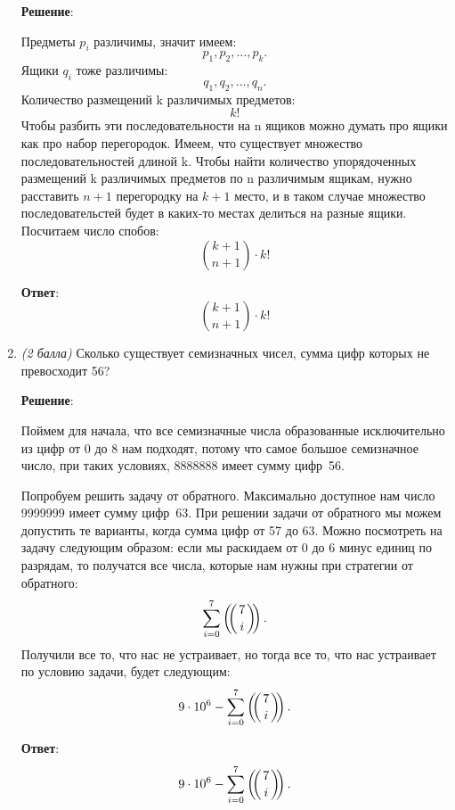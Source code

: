 \documentclass{article}
\def\multiset#1#2{\ensuremath{\left(\kern-.3em\left(\genfrac{}{}{0pt}{}{#1}{#2}\right)\kern-.3em\right)}}
\begin{document}
\begin{enumerate}
    \textbf{Решение}:

    Предметы $p_i$ различимы, значит имеем:
    \begin{equation}
      p_1, p_2, \ldots, p_k.
    \end{equation}
    Ящики $q_i$ тоже различимы:
    \begin{equation}
      q_1, q_2, \ldots, q_n.
    \end{equation}
    Количество размещений k различимых предметов:
    \begin{equation}
      k!
    \end{equation}
    Чтобы разбить эти последовательности на n ящиков можно думать про ящики как про набор перегородок. Имеем, что существует множество последовательностей длиной k. Чтобы найти количество упорядоченных размещений k различимых предметов по n различимым ящикам, нужно расставить $n + 1$ перегородку на $k + 1$ место, и в таком случае множество последовательстей будет в каких-то местах делиться на разные ящики. Посчитаем число спобов:
    \begin{equation}
      \binom{k + 1}{n + 1} \cdot k!
    \end{equation}

    \textbf{Ответ}:
    $$\binom{k + 1}{n + 1} \cdot k!$$

  \item \textit{(2 балла)} Сколько существует семизначных чисел, сумма цифр которых не превосходит 56?
  
    \textbf{Решение}:

    Поймем для начала, что все семизначные числа образованные исключительно из цифр от 0 до 8 нам подходят, потому что самое большое семизначное число, при таких условиях, 8888888 имеет сумму цифр~56.
    
    Попробуем решить задачу от обратного. Максимально доступное нам число 9999999 имеет сумму цифр~63. При решении задачи от обратного мы можем допустить те варианты, когда сумма цифр от 57 до 63. Можно посмотреть на задачу следующим образом: если мы раскидаем от 0 до 6 минус единиц по разрядам, то получатся все числа, которые нам нужны при стратегии от обратного:
    \begin{equation}
      \sum_{i = 0}^{7} \multiset{7}{i}.
    \end{equation}
    Получили все то, что нас не устраивает, но тогда все то, что нас устраивает по условию задачи, будет следующим:
    \begin{equation}
      9 \cdot 10^6 - \sum_{i = 0}^{7} \multiset{7}{i}.
    \end{equation}

    \textbf{Ответ}:
    $$9 \cdot 10^6 - \sum_{i = 0}^{7} \multiset{7}{i}.$$
  \end{enumerate}
\end{document}
